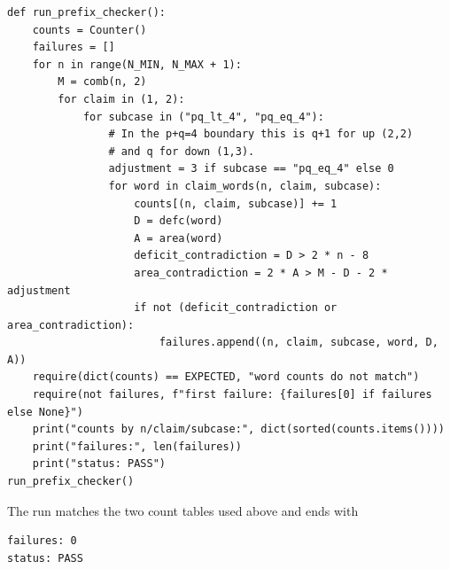 \documentclass[11pt]{article}
\theoremstyle{plain}
\theoremstyle{definition}
\theoremstyle{remark}
\begin{document}
\begin{lstlisting}
def run_prefix_checker():
    counts = Counter()
    failures = []
    for n in range(N_MIN, N_MAX + 1):
        M = comb(n, 2)
        for claim in (1, 2):
            for subcase in ("pq_lt_4", "pq_eq_4"):
                # In the p+q=4 boundary this is q+1 for up (2,2)
                # and q for down (1,3).
                adjustment = 3 if subcase == "pq_eq_4" else 0
                for word in claim_words(n, claim, subcase):
                    counts[(n, claim, subcase)] += 1
                    D = defc(word)
                    A = area(word)
                    deficit_contradiction = D > 2 * n - 8
                    area_contradiction = 2 * A > M - D - 2 * adjustment
                    if not (deficit_contradiction or area_contradiction):
                        failures.append((n, claim, subcase, word, D, A))
    require(dict(counts) == EXPECTED, "word counts do not match")
    require(not failures, f"first failure: {failures[0] if failures else None}")
    print("counts by n/claim/subcase:", dict(sorted(counts.items())))
    print("failures:", len(failures))
    print("status: PASS")
run_prefix_checker()
\end{lstlisting}
The run matches the two count tables used above and ends with
\begin{lstlisting}
failures: 0
status: PASS
\end{lstlisting}
\end{document}
